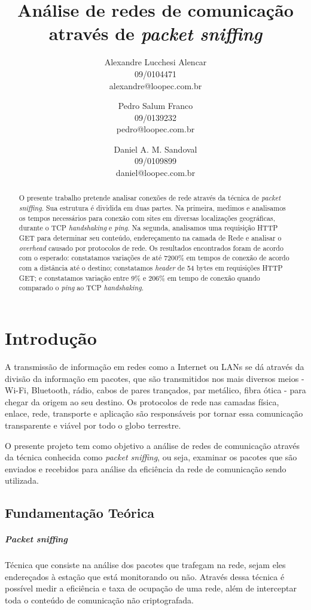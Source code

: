 \documentclass[12pt,a4paper]{report}
\title{Análise de redes de comunicação através de \textit{packet sniffing}}
\author{Alexandre Lucchesi Alencar\\
	09/0104471\\
	alexandre@loopec.com.br
	\and
	Pedro Salum Franco\\
	09/0139232\\
	pedro@loopec.com.br
	\and
	Daniel A. M. Sandoval\\
	09/0109899\\
	daniel@loopec.com.br}
\begin{document}
\maketitle

\begin{abstract}
O presente trabalho pretende analisar conexões de rede através da técnica de \textit{packet sniffing}. Sua estrutura é dividida em duas partes. Na primeira, medimos e analisamos os tempos necessários para conexão com sites em diversas localizações geográficas, durante o TCP \textit{handshaking} e \textit{ping}. Na segunda, analisamos uma requisição HTTP GET para determinar seu conteúdo, endereçamento na camada de Rede e analisar o \textit{overhead} causado por protocolos de rede. Os resultados encontrados foram de acordo com o esperado: constatamos variações de até 7200\% em tempos de conexão de acordo com a distância até o destino; constatamos \textit{header} de 54 bytes em requisições HTTP GET; e constatamos variação entre 9\% e 206\% em tempo de conexão quando comparado o \textit{ping} ao TCP \textit{handshaking}.

\end{abstract}

\tableofcontents

\chapter{Introdução}

A transmissão de informação em redes como a Internet ou LANs se dá através da divisão da informação em pacotes, que são transmitidos nos mais diversos meios - Wi-Fi, Bluetooth, rádio, cabos de pares trançados, par metálico, fibra ótica - para chegar da origem ao seu destino.
Os protocolos de rede nas camadas física, enlace, rede, transporte e aplicação são responsáveis por tornar essa comunicação transparente e viável por todo o globo terrestre.

O presente projeto tem como objetivo a análise de redes de comunicação através da técnica conhecida como \textit{packet sniffing}, ou seja, examinar os pacotes que são enviados e recebidos para análise da eficiência da rede de comunicação sendo utilizada.

\section{Fundamentação Teórica}

\paragraph{\textit{Packet sniffing}} Técnica que consiste na análise dos pacotes que trafegam na rede, sejam eles endereçados à estação que está monitorando ou não. Através dessa técnica é possível medir a eficiência e taxa de ocupação de uma rede, além de interceptar toda o conteúdo de comunicação não criptografada.
\end{document}
